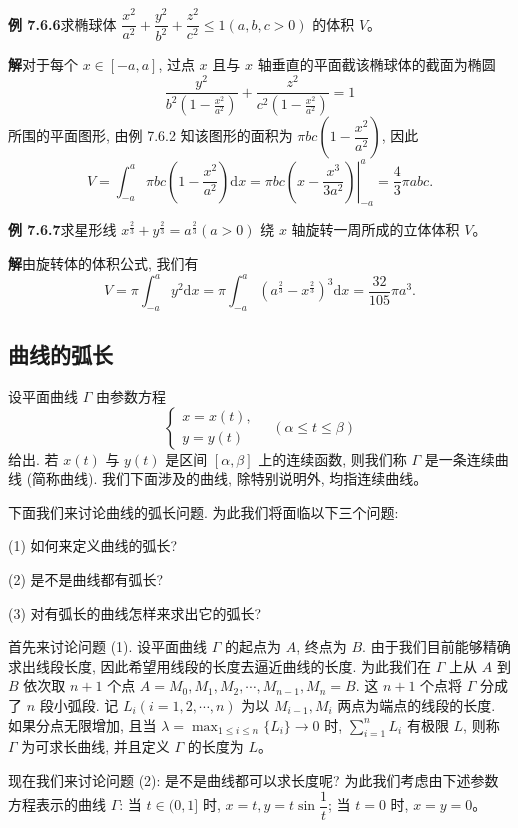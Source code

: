 \documentclass[UTF8,12pt,a4paper,fontset=fandol]{ctexart}
\begin{document}
\noindent\textbf{例 7.6.6}\quad 求椭球体 $\dfrac{x^2}{a^2}+\dfrac{y^2}{b^2}+\dfrac{z^2}{c^2}\leq1(a,b,c>0)$ 的体积 $V$。

\noindent\textbf{解}\quad 对于每个 $x\in[-a,a]$, 过点 $x$ 且与 $x$ 轴垂直的平面截该椭球体的截面为椭圆
\[
  \frac{y^2}{b^2\left(1-\frac{x^2}{a^2}\right)}
  +\frac{z^2}{c^2\left(1-\frac{x^2}{a^2}\right)}=1
\]
所围的平面图形, 由例 7.6.2 知该图形的面积为 $\pi bc\left(1-\dfrac{x^2}{a^2}\right)$, 因此
\[
  V=\int_{-a}^a \pi bc\left(1-\frac{x^2}{a^2}\right)\mathrm dx
  =\left.\pi bc\left(x-\frac{x^3}{3a^2}\right)\right|_{-a}^a
  =\frac{4}{3}\pi abc.
\]

\noindent\textbf{例 7.6.7}\quad 求星形线 $x^{\frac23}+y^{\frac23}=a^{\frac23}(a>0)$ 绕 $x$ 轴旋转一周所成的立体体积 $V$。

\noindent\textbf{解}\quad 由旋转体的体积公式, 我们有
\[
  V=\pi\int_{-a}^a y^2\mathrm dx
  =\pi\int_{-a}^a (a^{\frac23}-x^{\frac23})^3\mathrm dx
  =\frac{32}{105}\pi a^3.
\]

\subsection{曲线的弧长}

设平面曲线 $\Gamma$ 由参数方程
\[
  \begin{cases}
    x=x(t),\\
    y=y(t)
  \end{cases}
  \quad(\alpha\leq t\leq\beta)
\]
给出. 若 $x(t)$ 与 $y(t)$ 是区间 $[\alpha,\beta]$ 上的连续函数, 则我们称 $\Gamma$ 是一条连续曲线 (简称曲线). 我们下面涉及的曲线, 除特别说明外, 均指连续曲线。

下面我们来讨论曲线的弧长问题. 为此我们将面临以下三个问题:

(1) 如何来定义曲线的弧长?

(2) 是不是曲线都有弧长?

(3) 对有弧长的曲线怎样来求出它的弧长?

首先来讨论问题 (1). 设平面曲线 $\Gamma$ 的起点为 $A$, 终点为 $B$. 由于我们目前能够精确求出线段长度, 因此希望用线段的长度去逼近曲线的长度. 为此我们在 $\Gamma$ 上从 $A$ 到 $B$ 依次取 $n+1$ 个点 $A=M_0,M_1,M_2,\cdots,M_{n-1},M_n=B$. 这 $n+1$ 个点将 $\Gamma$ 分成了 $n$ 段小弧段. 记 $L_i(i=1,2,\cdots,n)$ 为以 $M_{i-1},M_i$ 两点为端点的线段的长度. 如果分点无限增加, 且当 $\lambda=\max_{1\leq i\leq n}\{L_i\}\to0$ 时, $\sum_{i=1}^n L_i$ 有极限 $L$, 则称 $\Gamma$ 为可求长曲线, 并且定义 $\Gamma$ 的长度为 $L$。

现在我们来讨论问题 (2): 是不是曲线都可以求长度呢? 为此我们考虑由下述参数方程表示的曲线 $\Gamma$: 当 $t\in(0,1]$ 时, $x=t,y=t\sin\dfrac{1}{t}$; 当 $t=0$ 时, $x=y=0$。
\end{document}
